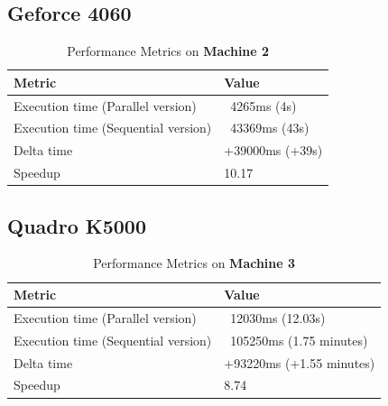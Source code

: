         
        \subsection{Geforce 4060}
        
        \begin{table}[H]
            \centering
            \begin{tabular}{|l|l|}
            \hline
            \textbf{Metric}                         & \textbf{Value}                       \\ \hline
            Execution time (Parallel version)       & ~4265ms (4s)                          \\ \hline
            Execution time (Sequential version)     & ~43369ms (43s)                        \\ \hline
            Delta time                               & +39000ms (+39s)                       \\ \hline
            Speedup                                  & 10.17                                  \\ \hline
            \end{tabular}
            \caption{Performance Metrics on \textbf{Machine 2}}
            \label{table:performance_metrics_test3_machine2}
        \end{table}
        
        
        \subsection{Quadro K5000}
        
        \begin{table}[H]
            \centering
            \begin{tabular}{|l|l|}
            \hline
            \textbf{Metric}                         & \textbf{Value}                       \\ \hline
            Execution time (Parallel version)       & ~12030ms (12.03s)                     \\ \hline
            Execution time (Sequential version)     & ~105250ms (1.75 minutes)             \\ \hline
            Delta time                               & +93220ms (+1.55 minutes)             \\ \hline
            Speedup                                  & 8.74                                   \\ \hline
            \end{tabular}
            \caption{Performance Metrics on \textbf{Machine 3}}
            \label{table:performance_metrics_test3_machine3}
        \end{table}

